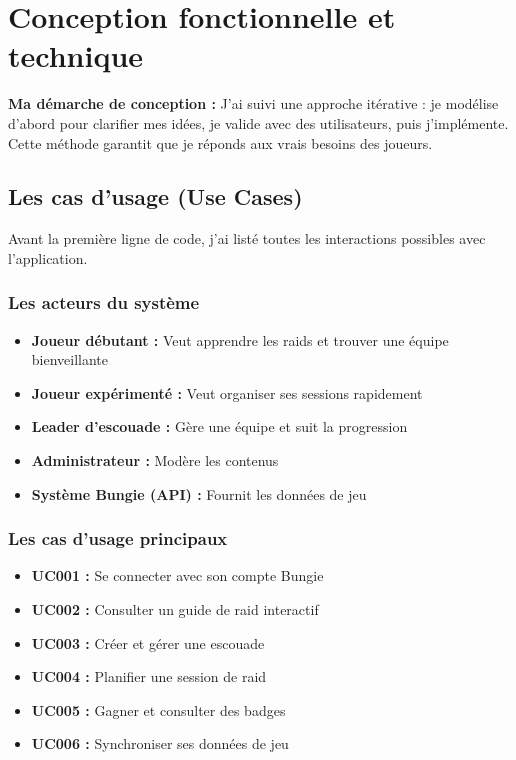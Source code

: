 \chapter{Conception fonctionnelle et technique}

\textbf{Ma démarche de conception :} J'ai suivi une approche itérative : je modélise d'abord pour clarifier mes idées, je valide avec des utilisateurs, puis j'implémente. Cette méthode garantit que je réponds aux vrais besoins des joueurs.

\section{Les cas d'usage (Use Cases)}

Avant la première ligne de code, j'ai listé toutes les interactions possibles avec l'application.

\subsection{Les acteurs du système}

\begin{itemize}
    \item \textbf{Joueur débutant :} Veut apprendre les raids et trouver une équipe bienveillante
    \item \textbf{Joueur expérimenté :} Veut organiser ses sessions rapidement
    \item \textbf{Leader d'escouade :} Gère une équipe et suit la progression
    \item \textbf{Administrateur :} Modère les contenus
    \item \textbf{Système Bungie (API) :} Fournit les données de jeu
\end{itemize}

\subsection{Les cas d'usage principaux}

\begin{itemize}
    \item \textbf{UC001 :} Se connecter avec son compte Bungie
    \item \textbf{UC002 :} Consulter un guide de raid interactif
    \item \textbf{UC003 :} Créer et gérer une escouade
    \item \textbf{UC004 :} Planifier une session de raid
    \item \textbf{UC005 :} Gagner et consulter des badges
    \item \textbf{UC006 :} Synchroniser ses données de jeu
\end{itemize}

